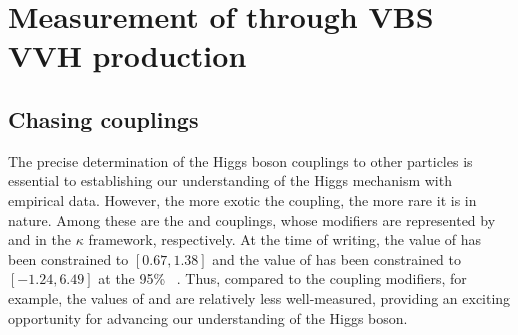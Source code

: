 \chapter{Measurement of \texorpdfstring{\kVV}{kVV} through VBS VVH production}\label{ch:vbsvvh}

\section{Chasing couplings}
The precise determination of the Higgs boson couplings to other particles is essential to establishing our understanding of the Higgs mechanism with empirical data. 
However, the more exotic the coupling, the more rare it is in nature. 
Among these are the \HHVV and \HHH couplings, whose modifiers are represented by \kVV and \kHHH in the $\kappa$ framework, respectively. 
At the time of writing, the value of \kVV has been constrained to $[0.67, 1.38]$ and the value of \kHHH has been constrained to $[-1.24, 6.49]$ at the 95\% \CL~\cite{NatureHiggsCMS2022}. 
Thus, compared to the \kV coupling modifiers, for example, the values of \kVV and \kHHH are relatively less well-measured, providing an exciting opportunity for advancing our understanding of the Higgs boson. 

